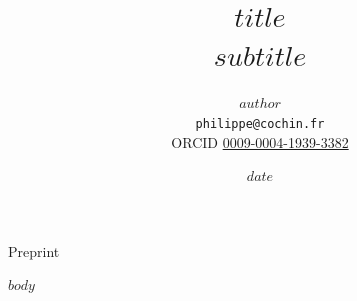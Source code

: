 \documentclass[11pt,a4paper]{article}
\title{$title$\\[0.4em]{\large $subtitle$}}
\author{$author$\\\small\texttt{philippe@cochin.fr}\\
  \small ORCID \href{https://orcid.org/0009-0004-1939-3382}{0009-0004-1939-3382}}
\date{$date$}
\begin{document}
\maketitle
\begin{center}\small Preprint\end{center}
$body$
\end{document}
